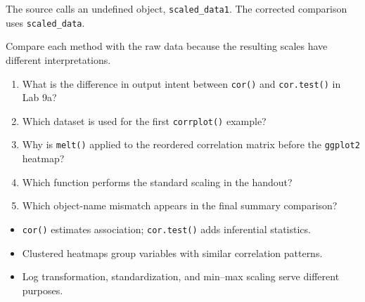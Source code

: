 \begin{pitfall}
The source calls an undefined object, \texttt{scaled\_data1}. The corrected comparison uses \texttt{scaled\_data}.
\end{pitfall}

\begin{dsfigure}
\end{dsfigure}

Compare each method with the raw data because the resulting scales have different interpretations.

\begin{quickcheck}
\begin{enumerate}
  \item What is the difference in output intent between \texttt{cor()} and \texttt{cor.test()} in Lab 9a?
  \item Which dataset is used for the first \texttt{corrplot()} example?
  \item Why is \texttt{melt()} applied to the reordered correlation matrix before the \texttt{ggplot2} heatmap?
  \item Which function performs the standard scaling in the handout?
  \item Which object-name mismatch appears in the final summary comparison?
\end{enumerate}
\end{quickcheck}

\begin{chapterrecap}
\begin{itemize}
  \item \texttt{cor()} estimates association; \texttt{cor.test()} adds inferential statistics.
  \item Clustered heatmaps group variables with similar correlation patterns.
  \item Log transformation, standardization, and min--max scaling serve different purposes.
\end{itemize}
\end{chapterrecap}
